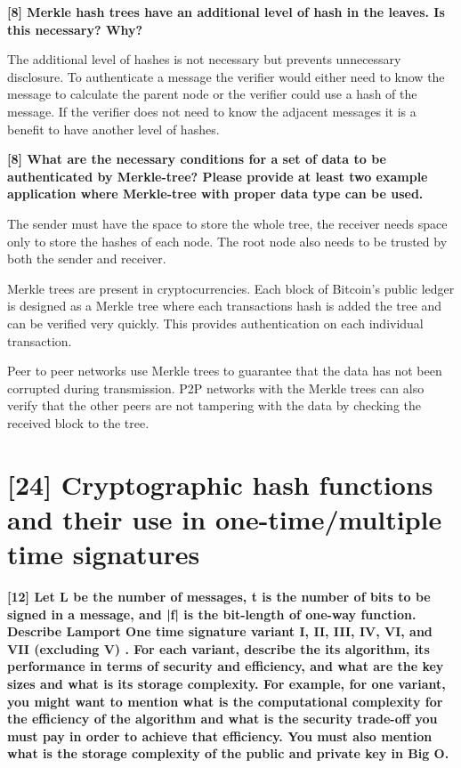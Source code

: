 \documentclass[letterpaper,11pt,notitlepage,fleqn]{article}
\begin{document}
\noindent \textbf{[8] Merkle hash trees have an additional level of hash in the leaves. Is this necessary? Why?}

The additional level of hashes is not necessary but prevents unnecessary disclosure. To authenticate a message the verifier would either need to know the message to calculate the parent node or the verifier could use a hash of the message. If the verifier does not need to know the adjacent messages it is a benefit to have another level of hashes. 

\noindent \textbf{[8] What are the necessary conditions for a set of data to be authenticated by Merkle-tree? Please provide at least two example application where Merkle-tree with proper data type can be used.}

The sender must have the space to store the whole tree, the receiver needs space only to store the hashes of each node. The root node also needs to be trusted by both the sender and receiver. 

Merkle trees are present in cryptocurrencies. Each block of Bitcoin's public ledger is designed as a Merkle tree where each transactions hash is added the tree and can be verified very quickly. This provides authentication on each individual transaction.

Peer to peer networks use Merkle trees to guarantee that the data has not been corrupted during transmission. P2P networks with the Merkle trees can also verify that the other peers are not tampering with the data by checking the received block to the tree. 


\section{[24] Cryptographic hash functions and their use in one-time/multiple time signatures}

\noindent \textbf{[12] Let L be the number of messages, t is the number of bits to be signed in a message, and |f| is the bit-length of one-way function. Describe Lamport One time signature variant I, II, III, IV, VI, and VII (excluding V) . For each variant, describe the its algorithm, its performance in terms of security and efficiency,  and what are the key sizes and what is its storage complexity. For example, for one variant, you might want to mention what is the computational complexity for the
efficiency  of the algorithm and what is the security trade-off you must pay in order to achieve that efficiency. You must also mention what is the storage complexity of the public and private key in Big O.} 
\end{document}
